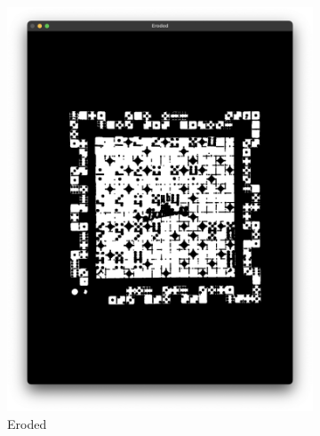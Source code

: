 \documentclass[12pt]{article}
\begin{document}
    \begin{figure}[!h]
        \ContinuedFloat
        \centering
        \begin{subfigure}{.5\textwidth}
            \centering
            \includegraphics[width=0.9\linewidth]{images/board_extraction/eroded.png}
            \caption{Eroded}
            \label{fig:be-eroded}
        \end{subfigure}%
        \begin{subfigure}{.5\textwidth}
            \centering

\end{subfigure}
\end{figure}
\end{document}
